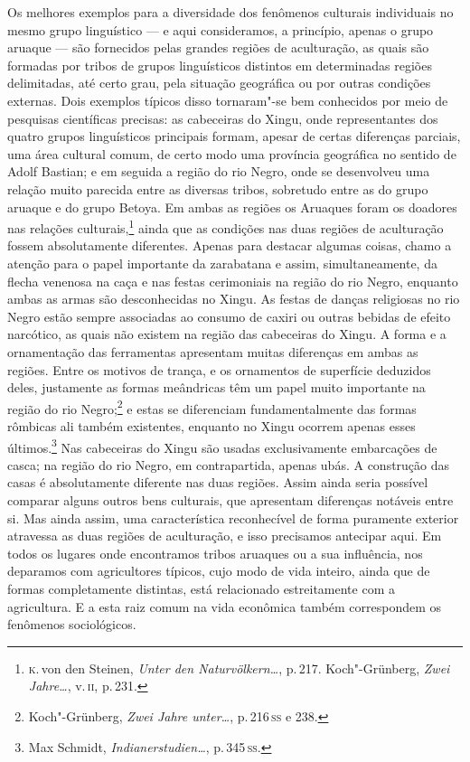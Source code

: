 Os melhores exemplos para a diversidade dos fenômenos culturais
individuais no mesmo grupo linguístico --- e aqui consideramos, a
princípio, apenas o grupo aruaque --- são fornecidos pelas grandes
regiões de aculturação, as quais são formadas por tribos de grupos
linguísticos distintos em determinadas regiões delimitadas, até certo
grau, pela situação geográfica ou por outras condições externas. Dois
exemplos típicos disso tornaram"-se bem conhecidos por meio de pesquisas
científicas precisas: as cabeceiras do Xingu, onde representantes dos
quatro grupos linguísticos principais formam, apesar de certas
diferenças parciais, uma área cultural comum, de certo modo uma
província geográfica no sentido de Adolf Bastian; e em seguida a
região do rio Negro, onde se desenvolveu uma relação muito parecida
entre as diversas tribos, sobretudo entre as do grupo aruaque e do grupo
Betoya. Em ambas as regiões os Aruaques foram os doadores nas relações
culturais,\footnote{\textsc{k}.\,von den Steinen, \textit{Unter den Naturvölkern\ldots}, p.\,217. Koch"-Grünberg, \textit{Zwei Jahre\ldots}, v.\,\textsc{ii}, p.\,231.} ainda que as condições
nas duas regiões de aculturação fossem absolutamente diferentes.
Apenas para destacar algumas coisas, chamo a atenção para o papel
importante da zarabatana e assim, simultaneamente, da flecha venenosa na
caça e nas festas cerimoniais na região do rio Negro, enquanto ambas as
armas são desconhecidas no Xingu. As festas de danças religiosas no rio
Negro estão sempre associadas ao consumo de caxiri ou outras bebidas de
efeito narcótico, as quais não existem na região das cabeceiras do
Xingu. A forma e a ornamentação das ferramentas apresentam muitas
diferenças em ambas as regiões. Entre os motivos de trança, e os
ornamentos de superfície deduzidos deles, justamente as formas
meândricas têm um papel muito importante na região do rio
Negro;\footnote{Koch"-Grünberg, \textit{Zwei Jahre unter\ldots}, 
p.\,216\,\textsc{ss} e 238.} e estas se diferenciam fundamentalmente das
formas rômbicas ali também existentes, enquanto no Xingu ocorrem apenas
esses últimos.\footnote{Max Schmidt, \textit{Indianerstudien\ldots}, p.\,345\,\textsc{ss}.} Nas cabeceiras do Xingu são
usadas exclusivamente embarcações de casca; na região do rio Negro, em
contrapartida, apenas ubás. A construção das casas é absolutamente
diferente nas duas regiões. Assim ainda seria possível comparar alguns
outros bens culturais, que apresentam diferenças notáveis entre si. Mas
ainda assim, uma característica reconhecível de forma puramente exterior
atravessa as duas regiões de aculturação, e isso precisamos antecipar
aqui. Em todos os lugares onde encontramos tribos aruaques ou a sua
influência, nos deparamos com agricultores típicos, cujo modo de vida
inteiro, ainda que de formas completamente distintas, está relacionado
estreitamente com a agricultura. E a esta raiz comum na vida econômica
também correspondem os fenômenos sociológicos.

